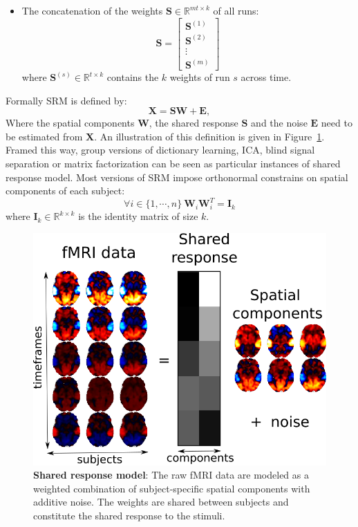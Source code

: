 \documentclass{report}
\begin{document}
\begin{itemize}
\item The concatenation of the weights $\mathbf{S} \in \mathbb{R}^{mt \times k}$ of all runs:
\begin{equation*}
\mathbf{S} = 
\begin{bmatrix}
    \mathbf{S}^{(1)} \\
    \mathbf{S}^{(2)} \\
    \vdots \\
    \mathbf{S}^{(m)}
\end{bmatrix}
\end{equation*}
where $\mathbf{S}^{(s)} \in \mathbb{R}^{t \times k}$ contains the $k$ weights of run $s$ across time.  


\end{itemize}

Formally SRM is defined by: 
\[
	\mathbf{X} = \mathbf{S}\mathbf{W} + \mathbf{E},
\]
Where the spatial components $\mathbf{W}$, the shared response $\mathbf{S}$ and the noise $\mathbf{E}$ need to be estimated from $\mathbf{X}$.
%
An illustration of this definition is given in Figure~\ref{fig:conceptual_figure1}.
%
Framed this way, group versions of dictionary learning, ICA, blind signal separation or matrix factorization can be seen as particular instances of shared response model.
%
Most versions of SRM impose orthonormal constrains on spatial components of each subject:
\[
	\forall i \in \{1, \cdots, n\}	\ \mathbf{W}_i \mathbf{W}_i^T = \mathbf{I}_k
\]
where $\mathbf{I}_k \in \mathbb{R}^{k \times k}$ is the identity matrix of size $k$.

\begin{figure}
\centering
\includegraphics[scale=0.5]{figures/srm/conceptual_figure31.png}
\caption{\textbf{Shared response model}: The raw fMRI data are modeled as a weighted combination of subject-specific spatial components with additive noise. The weights are shared between subjects and constitute the shared response to the stimuli.}
\label{fig:conceptual_figure1}
\end{figure}
\end{document}
